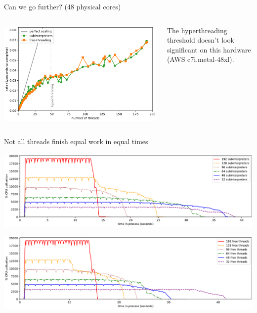 \documentclass[aspectratio=169]{beamer}
\begin{document}
\begin{frame}{Can we go further? (48 physical cores)}
\large
\vspace{0.5 cm}
\begin{columns}
\includegraphics[width=\linewidth]{img/scaling-of-compute-big.pdf}

The hyperthreading threshold doesn't look significant on this hardware (AWS c7i.metal-48xl).
\end{columns}
\end{frame}

\begin{frame}{Not all threads finish equal work in equal times}
\vspace{0.25 cm}
\begin{center}
\includegraphics[width=0.93\linewidth]{img/cpu-of-compute-subinterpreters-big.pdf}

\includegraphics[width=0.93\linewidth]{img/cpu-of-compute-free-threads-big.pdf}
\end{center}
\end{frame}
\end{document}
